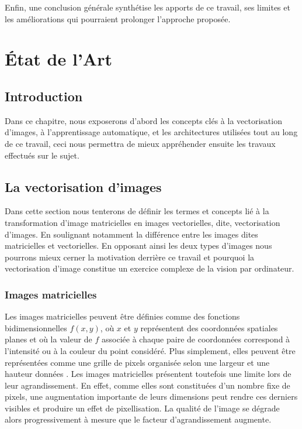 \documentclass[12pt, a4paper, oneside]{report}
\begin{document}
Enfin, une conclusion générale synthétise les apports de ce travail, ses limites et les
améliorations qui pourraient prolonger l'approche proposée.

\chapter{État de l'Art}
\label{chap:etat_art}

\section{Introduction}
Dans ce chapitre, nous exposerons d'abord les concepts clés à la vectorisation d'images, à l'apprentissage automatique, et les architectures utilisées tout au long de ce travail, ceci nous permettra de mieux appréhender ensuite les travaux effectués sur le sujet.

\section{La vectorisation d'images}
\label{sec:vectorisation_images}
Dans cette section nous tenterons de définir les termes et concepts lié à la transformation d'image matricielles en images vectorielles, dite, vectorisation d'images. En soulignant notamment la différence entre les images dites matricielles et vectorielles. En opposant ainsi les deux types d'images nous pourrons mieux cerner la motivation derrière ce travail et pourquoi la vectorisation d'image constitue un exercice complexe de la vision par ordinateur.
  \subsection{Images matricielles}
  Les images matricielles peuvent être définies comme des fonctions bidimensionnelles $f(x,y)$, où $x$ et $y$ représentent des coordonnées spatiales planes et où la valeur de $f$ associée à chaque paire de coordonnées correspond à l'intensité ou à la couleur du point considéré. Plus simplement, elles peuvent être représentées comme une grille de pixels organisée selon une largeur et une hauteur données \cite{gonzalez2018digital}. Les images matricielles présentent toutefois une limite lors de leur agrandissement. En effet, comme elles sont constituées d’un nombre fixe de pixels, une augmentation importante de leurs dimensions peut rendre ces derniers visibles et produire un effet de pixellisation. La qualité de l’image se dégrade alors progressivement à mesure que le facteur d’agrandissement augmente.
\end{document}
